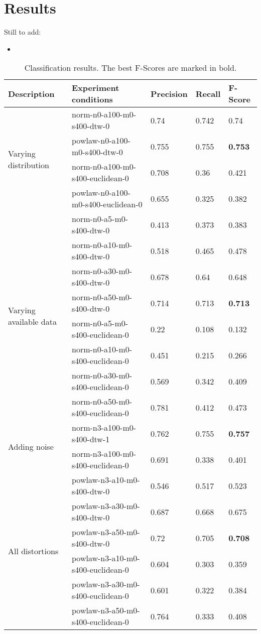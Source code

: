 \documentclass[10pt]{article}
\begin{document}
	\section{Results}
	Still to add:
	\begin{itemize}
		\item 
	\end{itemize}
	\begin{table}[ht!]
	\centering
	\begin{tabular}{|l|l|lll|}
		\hline Description & Experiment conditions & Precision & Recall & F-Score \\ \hline 
		\multirow{4}{*}{Varying distribution} 
		& norm-n0-a100-m0-s400-dtw-0 & 0.74 & 0.742 & 0.74\\ 
		& powlaw-n0-a100-m0-s400-dtw-0 & 0.755 & 0.755 & \textbf{0.753}\\ 
		& norm-n0-a100-m0-s400-euclidean-0 & 0.708 & 0.36 & 0.421\\ 
		& powlaw-n0-a100-m0-s400-euclidean-0 & 0.655 & 0.325 & 0.382\\ \hline
		
		\multirow{8}{*}{Varying available data}
		& norm-n0-a5-m0-s400-dtw-0 & 0.413 & 0.373 & 0.383\\ 
		& norm-n0-a10-m0-s400-dtw-0 & 0.518 & 0.465 & 0.478\\ 
		& norm-n0-a30-m0-s400-dtw-0 & 0.678 & 0.64 & 0.648\\ 
		& norm-n0-a50-m0-s400-dtw-0 & 0.714 & 0.713 & \textbf{0.713}\\ 
		& norm-n0-a5-m0-s400-euclidean-0 & 0.22 & 0.108 & 0.132\\ 
		& norm-n0-a10-m0-s400-euclidean-0 & 0.451 & 0.215 & 0.266\\ 
		& norm-n0-a30-m0-s400-euclidean-0 & 0.569 & 0.342 & 0.409\\ 
		& norm-n0-a50-m0-s400-euclidean-0 & 0.781 & 0.412 & 0.473\\ \hline
		
		\multirow{2}{*}{Adding noise}
		& norm-n3-a100-m0-s400-dtw-1 & 0.762 & 0.755 & \textbf{0.757}\\ 
		& norm-n3-a100-m0-s400-euclidean-0 & 0.691 & 0.338 & 0.401\\ \hline
		
		\multirow{6}{*}{All distortions}
		& powlaw-n3-a10-m0-s400-dtw-0 & 0.546 & 0.517 & 0.523\\ 
		& powlaw-n3-a30-m0-s400-dtw-0 & 0.687 & 0.668 & 0.675\\ 
		& powlaw-n3-a50-m0-s400-dtw-0 & 0.72 & 0.705 & \textbf{0.708}\\ 
		& powlaw-n3-a10-m0-s400-euclidean-0 & 0.604 & 0.303 & 0.359\\ 
		& powlaw-n3-a30-m0-s400-euclidean-0 & 0.601 & 0.322 & 0.384\\ 
		& powlaw-n3-a50-m0-s400-euclidean-0 & 0.764 & 0.333 & 0.408\\ \hline
	\end{tabular}
	\caption{Classification results. The best F-Scores are marked in bold.}
	\end{table}
		
\end{document}
